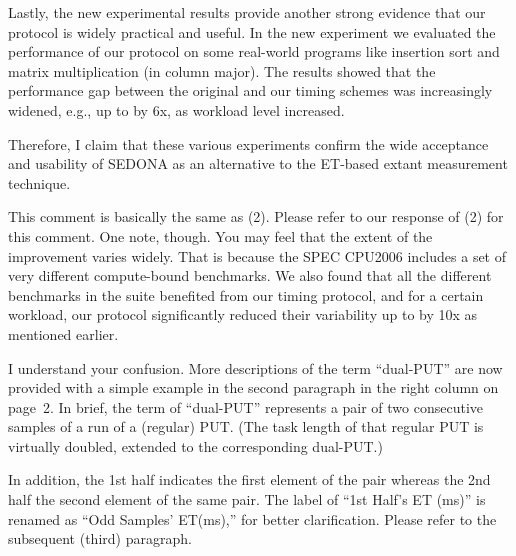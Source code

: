 \documentclass[10pt,letterpaper]{article}
\newenvironment{myindentpar}[1]%
{\begin{list}{}
         {\vspace{10pt}
					\setlength{\leftmargin}{#1}}
          \item[]
}
{\end{list}}
\newcommand{\rev}[1]{\begin{myindentpar}{.25in} {\em {\color{blue}{#1}}}\end{myindentpar}}
\begin{document}
Lastly, the new experimental results provide 
another strong evidence that our protocol is widely practical and useful. 
In the new experiment we evaluated the performance of our protocol 
on some real-world programs like insertion sort and matrix multiplication (in column major). 
The results showed that the performance gap between the original and our timing schemes  
was increasingly widened, e.g., up to by 6x, as workload level increased. 

Therefore, I claim that these various experiments confirm 
the wide acceptance and usability of SEDONA as an alternative to the 
ET-based extant measurement technique. 

\rev{ 
(3) The improvement of the SEDONA is little. And the extent of the each
benchmark’s improvement described in Table 3 varies widely. Thus, the
experimental results does not confirm whether the SEDONA is widely
practical or is useful.
}

This comment is basically the same as (2). Please refer to our response of (2) for this comment. One note, though. You may feel that the extent of the improvement varies widely. That is because the SPEC CPU2006 includes a set of very different compute-bound benchmarks. We also found that all the different benchmarks in the suite benefited from our timing protocol, and for a certain workload, our protocol significantly reduced their variability up to by 10x as mentioned earlier.


\rev{ 
(4) Since the explanation of ``dual-PUT'' is not enough, I can not well
understand the algorithm shown in Fig. 3. Similarly, what is “1st
Half’s ET (ms)” attached at Fig. 4(b), 4(c), 4(d) ? I understood only that
the label is related with “dual-PUT”. These words are important in the
manuscript. So, please keep in mind to write understandably.
}

I understand your confusion. More descriptions of the term ``\hbox{dual-PUT}'' are now 
provided with a simple example in the second paragraph in the right column on page~2.  
In brief, the term of ``dual-PUT'' represents 
a pair of two consecutive samples of a run of a (regular) PUT. 
(The task length of that regular PUT is virtually doubled, extended to the corresponding dual-PUT.) 

In addition, the 1st half indicates the first element of the pair 
whereas the 2nd half the second element of the same pair. 
The label of ``1st Half's ET (ms)'' is renamed as ``Odd Samples' ET(ms),'' 
for better clarification. Please refer to the subsequent (third) paragraph. 
\end{document}
